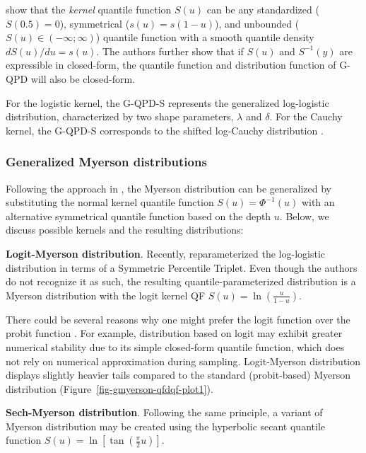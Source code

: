 \documentclass[
  fleqn,
  deca,
  blindrev
]{informs4}
\begin{document}
\citet{hadlock2019GeneralizedJohnsonQuantileParameterized} show that the
\emph{kernel} quantile function \(S(u)\) can be any standardized
(\(S(0.5)=0\)), symmetrical (\(s(u)=s(1-u)\)), and unbounded
(\(S(u)\in(-\infty;\infty)\)) quantile function with a smooth quantile
density \(dS(u)/du=s(u)\). The authors further show that if \(S(u)\) and
\(S^{-1}(y)\) are expressible in closed-form, the quantile function and
distribution function of G-QPD will also be closed-form.

For the logistic kernel, the G-QPD-S represents the generalized
log-logistic distribution, characterized by two shape parameters,
\(\lambda\) and \(\delta\). For the Cauchy kernel, the G-QPD-S
corresponds to the shifted log-Cauchy distribution
\citep{hadlock2019GeneralizedJohnsonQuantileParameterized}.

\subsubsection{Generalized Myerson distributions}\label{sec-genmyerson}

Following the approach in
\citet{hadlock2019GeneralizedJohnsonQuantileParameterized}, the Myerson
distribution can be generalized by substituting the normal kernel
quantile function \(S(u)=\Phi^{-1}(u)\) with an alternative symmetrical
quantile function based on the depth \(u\). Below, we discuss possible
kernels and the resulting distributions:

\textbf{Logit-Myerson distribution}. Recently,
\citet{wilson2023ReconciliationExpertPriors} reparameterized the
log-logistic distribution in terms of a Symmetric Percentile Triplet.
Even though the authors do not recognize it as such, the resulting
quantile-parameterized distribution is a Myerson distribution with the
logit kernel QF \(S(u)=\ln\left(\frac{u}{1-u}\right)\).

There could be several reasons why one might prefer the logit function
over the probit function \citep{berkson1951WhyPreferLogits}. For
example, distribution based on logit may exhibit greater numerical
stability due to its simple closed-form quantile function, which does
not rely on numerical approximation during sampling. Logit-Myerson
distribution displays slightly heavier tails compared to the standard
(probit-based) Myerson distribution
(Figure~\ref{fig-gmyerson-qfdqf-plot1}).

\textbf{Sech-Myerson distribution}. Following the same principle, a
variant of Myerson distribution may be created using the hyperbolic
secant quantile function
\(S(u)=\ln\left[\tan\left(\frac{\pi}{2}u\right)\right]\).
\end{document}
